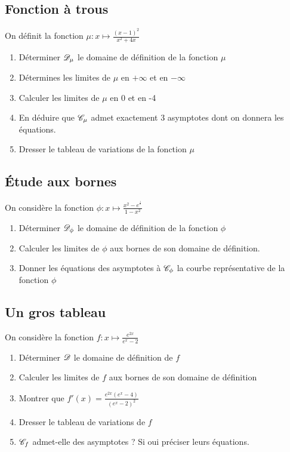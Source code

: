 \documentclass[oneside,12pt]{book}          %
\begin{document}
\subsection{Fonction à trous}
On définit la fonction $\mu : x\mapsto \frac{(x-1)^2}{x^2+4x}$
\begin{enumerate}
	\item Déterminer ${\mathscr{D}}_\mu$ le domaine de définition de la fonction $\mu$
	\item Détermines les limites de $\mu$ en $+\infty$ et en $-\infty$
	\item Calculer les limites de $\mu$ en 0 et en -4
	\item En déduire que ${\mathscr{C}}_\mu$ admet exactement 3 asymptotes dont on donnera les équations.
	\item Dresser le tableau de variations de la fonction $\mu$
\end{enumerate}



\subsection{Étude aux bornes}
On considère la fonction $\phi:x\mapsto\frac{x^2-e^{^{\frac{1}{x}}}}{1-x^2}$
\begin{enumerate}
    \item Déterminer ${\mathscr{D}}_\phi$ le domaine de définition de la fonction $\phi$
    \item Calculer les limites de $\phi$ aux bornes de son domaine de définition.
    \item Donner les équations des asymptotes à ${\mathscr{C}}_\phi$ la courbe représentative de la fonction $\phi$
\end{enumerate}



\subsection{Un gros tableau}
On considère la fonction $f:x\mapsto \frac{e^{2x}}{e^x-2}$
\begin{enumerate}
	\item Déterminer ${\mathscr{D}}$ le domaine de définition de $f$
	\item Calculer les limites de $f$ aux bornes de son domaine de définition
	\item Montrer que $f'(x)=\frac{e^{2x}(e^x-4)}{(e^x-2)^2}$
	\item Dresser le tableau de variations de $f$
	\item ${\mathscr{C}}_f$ admet-elle des asymptotes ? Si  oui préciser leurs équations.
\end{enumerate}
\end{document}
